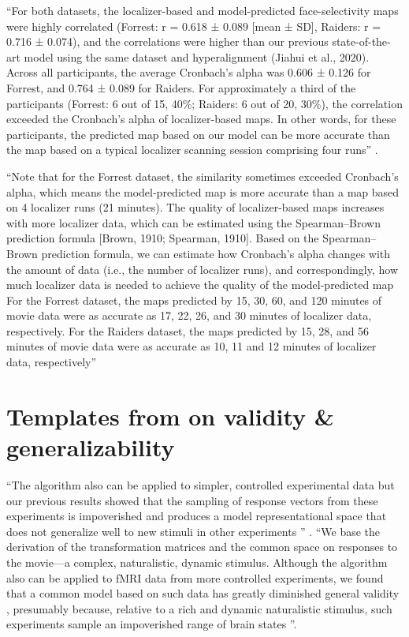 %
``For both datasets, the localizer-based and model-predicted face-selectivity
maps were highly correlated (Forrest: r = 0.618 ± 0.089 [mean ± SD], Raiders: r
= 0.716 ± 0.074), and the correlations were higher than our previous
state-of-the-art model using the same dataset and hyperalignment (Jiahui et al.,
2020).
%
Across all participants, the average Cronbach's alpha was 0.606 ± 0.126 for
Forrest, and 0.764 ± 0.089 for Raiders.
%
For approximately a third of the participants (Forrest: 6 out of 15, 40\%;
Raiders: 6 out of 20, 30\%), the correlation exceeded the Cronbach's alpha of
localizer-based maps.
%
In other words, for these participants, the predicted map based on our model can
be more accurate than the map based on a typical localizer scanning session
comprising four runs'' \citep{feilong2022individualized}.

%
``Note that for the Forrest dataset, the similarity sometimes exceeded
Cronbach's alpha, which means the model-predicted map is more accurate than a
map based on 4 localizer runs (21 minutes).
%
The quality of localizer-based maps increases with more localizer data, which
can be estimated using the Spearman–Brown prediction formula [Brown, 1910;
Spearman, 1910].
%
Based on the Spearman–Brown prediction formula, we can estimate how Cronbach's
alpha changes with the amount of data (i.e., the number of localizer runs), and
correspondingly, how much localizer data is needed to achieve the quality of the
model-predicted map
%
For the Forrest dataset, the maps predicted by 15, 30, 60, and 120 minutes of
movie data were as accurate as 17, 22, 26, and 30 minutes of localizer data,
respectively.
%
For the Raiders dataset, the maps predicted by 15, 28, and 56 minutes of movie
data were as accurate as 10, 11 and 12 minutes of localizer data, respectively''
\citep{feilong2022individualized}


\pagebreak

\section{Templates from \citet{haxby2011common} on validity \& generalizability}

%
``The algorithm also can be applied to simpler, controlled experimental data but
our previous results showed that the sampling of response vectors from these
experiments is impoverished and produces a model representational space that
does not generalize well to new stimuli in other experiments
\citep{haxby2020hyperalignment}'' \citep{guntupalli2016model}.
%
``We base the derivation of the transformation matrices and the common space on
responses to the movie---a complex, naturalistic, dynamic stimulus.
%
Although the algorithm also can be applied to fMRI data from more controlled
experiments, we found that a common model based on such data has greatly
diminished general validity \citep{haxby2011common}, presumably because,
relative to a rich and dynamic naturalistic stimulus, such experiments sample an
impoverished range of brain states \citep{guntupalli2016model}''.

